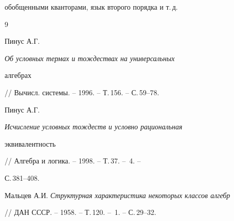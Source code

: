 обобщенными кванторами, язык второго порядка и т.\,д. 


 


 


\begin{thebibliography}{9} 


 




Пинус А.Г. {\em Об условных термах и тождествах на универсальных 


алгебрах} // Вычисл. системы. -- 1996. -- Т.\,156. -- С.\,59--78. 




Пинус А.Г. {\em Исчисление условных тождеств и условно рациональная 


эквивалентность} // Алгебра и логика. -- 1998. -- Т.\,37. -- \No\,4. -- 


С.\,381--408. 




Мальцев А.И. {\em Структурная характеристика некоторых классов алгебр} 


// ДАН СССР. -- 1958. -- Т.\,120. -- \No\,1. -- С.\,29--32. 


 


 


\end{thebibliography} 


 


\vskip 2cm 


 






 


\label{end} 


 


